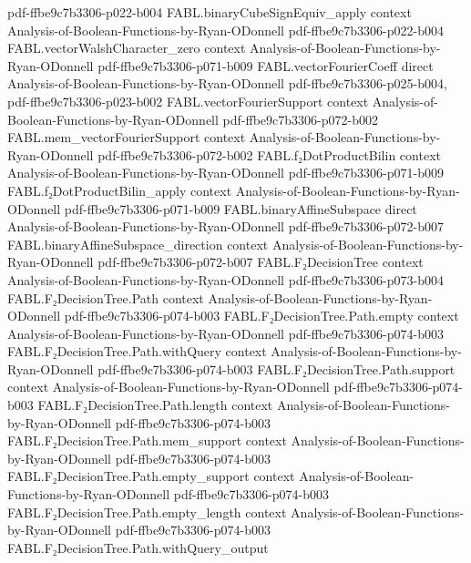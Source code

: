 \begin{theorem}
  {pdf-ffbe9c7b3306-p022-b004}
\proofstep
  {FABL.binaryCubeSignEquiv_apply}
  {context}
  {Analysis-of-Boolean-Functions-by-Ryan-ODonnell}
  {pdf-ffbe9c7b3306-p022-b004}
\proofstep
  {FABL.vectorWalshCharacter_zero}
  {context}
  {Analysis-of-Boolean-Functions-by-Ryan-ODonnell}
  {pdf-ffbe9c7b3306-p071-b009}
\proofstep
  {FABL.vectorFourierCoeff}
  {direct}
  {Analysis-of-Boolean-Functions-by-Ryan-ODonnell}
  {pdf-ffbe9c7b3306-p025-b004,
    pdf-ffbe9c7b3306-p023-b002}
\proofstep
  {FABL.vectorFourierSupport}
  {context}
  {Analysis-of-Boolean-Functions-by-Ryan-ODonnell}
  {pdf-ffbe9c7b3306-p072-b002}
\proofstep
  {FABL.mem_vectorFourierSupport}
  {context}
  {Analysis-of-Boolean-Functions-by-Ryan-ODonnell}
  {pdf-ffbe9c7b3306-p072-b002}
\proofstep
  {FABL.f₂DotProductBilin}
  {context}
  {Analysis-of-Boolean-Functions-by-Ryan-ODonnell}
  {pdf-ffbe9c7b3306-p071-b009}
\proofstep
  {FABL.f₂DotProductBilin_apply}
  {context}
  {Analysis-of-Boolean-Functions-by-Ryan-ODonnell}
  {pdf-ffbe9c7b3306-p071-b009}
\proofstep
  {FABL.binaryAffineSubspace}
  {direct}
  {Analysis-of-Boolean-Functions-by-Ryan-ODonnell}
  {pdf-ffbe9c7b3306-p072-b007}
\proofstep
  {FABL.binaryAffineSubspace_direction}
  {context}
  {Analysis-of-Boolean-Functions-by-Ryan-ODonnell}
  {pdf-ffbe9c7b3306-p072-b007}
\proofstep
  {FABL.F₂DecisionTree}
  {context}
  {Analysis-of-Boolean-Functions-by-Ryan-ODonnell}
  {pdf-ffbe9c7b3306-p073-b004}
\proofstep
  {FABL.F₂DecisionTree.Path}
  {context}
  {Analysis-of-Boolean-Functions-by-Ryan-ODonnell}
  {pdf-ffbe9c7b3306-p074-b003}
\proofstep
  {FABL.F₂DecisionTree.Path.empty}
  {context}
  {Analysis-of-Boolean-Functions-by-Ryan-ODonnell}
  {pdf-ffbe9c7b3306-p074-b003}
\proofstep
  {FABL.F₂DecisionTree.Path.withQuery}
  {context}
  {Analysis-of-Boolean-Functions-by-Ryan-ODonnell}
  {pdf-ffbe9c7b3306-p074-b003}
\proofstep
  {FABL.F₂DecisionTree.Path.support}
  {context}
  {Analysis-of-Boolean-Functions-by-Ryan-ODonnell}
  {pdf-ffbe9c7b3306-p074-b003}
\proofstep
  {FABL.F₂DecisionTree.Path.length}
  {context}
  {Analysis-of-Boolean-Functions-by-Ryan-ODonnell}
  {pdf-ffbe9c7b3306-p074-b003}
\proofstep
  {FABL.F₂DecisionTree.Path.mem_support}
  {context}
  {Analysis-of-Boolean-Functions-by-Ryan-ODonnell}
  {pdf-ffbe9c7b3306-p074-b003}
\proofstep
  {FABL.F₂DecisionTree.Path.empty_support}
  {context}
  {Analysis-of-Boolean-Functions-by-Ryan-ODonnell}
  {pdf-ffbe9c7b3306-p074-b003}
\proofstep
  {FABL.F₂DecisionTree.Path.empty_length}
  {context}
  {Analysis-of-Boolean-Functions-by-Ryan-ODonnell}
  {pdf-ffbe9c7b3306-p074-b003}
\proofstep
  {FABL.F₂DecisionTree.Path.withQuery_output}

\end{theorem}
